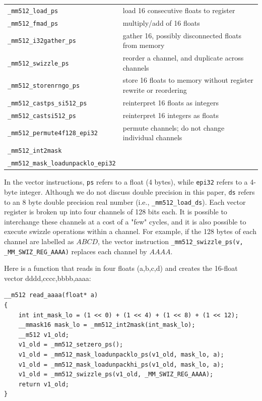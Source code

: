 \documentclass[10pt,conference,compsocconf]{IEEEtran}
\def\blue#1{\textbf{\textcolor{blue}{#1}}}
\def\qes#1{{\blue{*** For Erik: #1 ***}}}
\def\ttt#1{{\tt #1}}
\def\qes#1{}
\begin{document}
\def\loadps{\ttt{\_mm512\_load\_ps}}
\def\loadds{\ttt{\_mm512\_load\_ds}}
\def\fmadps{\ttt{\_mm512\_fmad\_ps}}
\def\gatherps{\ttt{\_mm512\_i32gather\_ps}}
\def\swizzleps{\ttt{\_mm512\_swizzle\_ps}}
\def\storenrngops{\ttt{\_mm512\_storenrngo\_ps}}
\def\castsi{\ttt{\_mm512\_castsi512\_ps}}
\def\permute{\ttt{\_mm512\_permute4f128\_epi32}}
\def\intmask{\ttt{\_mm512\_int2mask}}
\def\loadunpack{\ttt{\_mm512\_mask\_loadunpacklo\_epi32}}
\def\castitops{\ttt{\_mm512\_castsi512\_ps}}
\def\castpstoi{\ttt{\_mm512\_castps\_si512\_ps}}
%
\begin{center}
\begin{tabular}{|l|l|}
\hline
\loadps &  load 16 consecutive floats to register\\
\fmadps &  multiply/add of 16 floats\\
\gatherps &  gather 16, possibly disconnected floats from memory\\
\swizzleps &  reorder a channel, and duplicate across channels\\
\storenrngops &  store 16 floats to memory without register rewrite or reordering\\
\castpstoi & reinterpret 16 floats as integers\\
\castitops & reinterpret 16 integers as floats\\
\permute &  permute channels; do not change individual channels\\
\intmask &  \\
\loadunpack &  \\
\hline
\end{tabular}
\end{center}
%
In the vector instructions, \ttt{ps} refers to a float (4 bytes),
while \ttt{epi32} refers to a 4-byte integer. Although we do not
discuss double precision in this paper, \ttt{ds} refers to an 8 byte
double precision real number (i.e., \loadds).  Each vector register is
broken up into four channels of 128 bits each. It is possible to
interchange these channels at a cost of a "few" \qes{exact numbers?}
cycles, and it is also possible to execute swizzle operations within a
channel. For example, if the 128 bytes of each channel are labelled as
$ABCD$, the vector instruction \ttt{\_mm512\_swizzle\_ps(v,
  \_MM\_SWIZ\_REG\_AAAA)} replaces each channel by $AAAA$.

Here is a function that reads in four floats (a,b,c,d) and creates the 16-float vector dddd,cccc,bbbb,aaaa: 
\begin{verbatim}
__m512 read_aaaa(float* a)                                                              
{
    int int_mask_lo = (1 << 0) + (1 << 4) + (1 << 8) + (1 << 12);
    __mmask16 mask_lo = _mm512_int2mask(int_mask_lo);
    __m512 v1_old;
    v1_old = _mm512_setzero_ps();
    v1_old = _mm512_mask_loadunpacklo_ps(v1_old, mask_lo, a);
    v1_old = _mm512_mask_loadunpackhi_ps(v1_old, mask_lo, a);
    v1_old = _mm512_swizzle_ps(v1_old, _MM_SWIZ_REG_AAAA);
    return v1_old;
}
\end{verbatim}
\end{document}
